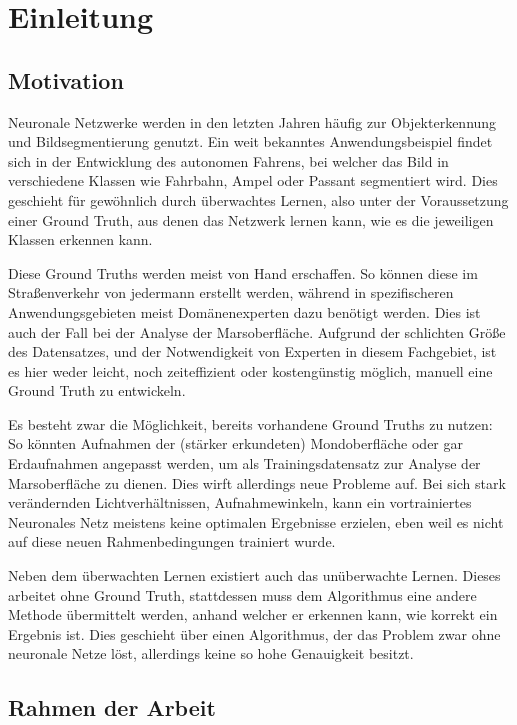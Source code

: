 \chapter{Einleitung}
\label{chap:einleitung}

\section{Motivation}
\label{sec:motivation}

Neuronale Netzwerke werden in den letzten Jahren häufig zur Objekterkennung und Bildsegmentierung genutzt. Ein weit bekanntes Anwendungsbeispiel findet sich in der Entwicklung des autonomen Fahrens, bei welcher das Bild in verschiedene Klassen wie \zB Fahrbahn, Ampel oder Passant segmentiert wird. Dies geschieht für gewöhnlich durch überwachtes Lernen, also unter der Voraussetzung einer Ground Truth, aus denen das Netzwerk lernen kann, wie es die jeweiligen Klassen erkennen kann.

Diese Ground Truths werden meist von Hand erschaffen. So können diese im Straßenverkehr von jedermann erstellt werden, während in spezifischeren Anwendungsgebieten meist Domänenexperten dazu benötigt werden. Dies ist auch der Fall bei der Analyse der Marsoberfläche. Aufgrund der schlichten Größe des Datensatzes, und der Notwendigkeit von Experten in diesem Fachgebiet, ist es hier weder leicht, noch zeiteffizient oder kostengünstig möglich, manuell eine Ground Truth zu entwickeln.

Es besteht zwar die Möglichkeit, bereits vorhandene Ground Truths zu nutzen: So könnten \bspw Aufnahmen der (stärker erkundeten) Mondoberfläche oder gar Erdaufnahmen angepasst werden, um als Trainingsdatensatz zur Analyse der Marsoberfläche zu dienen. Dies wirft allerdings neue Probleme auf. Bei \bspw sich stark verändernden Lichtverhältnissen, Aufnahmewinkeln, \oa kann ein vortrainiertes Neuronales Netz meistens keine optimalen Ergebnisse erzielen, eben weil es nicht auf diese neuen Rahmenbedingungen trainiert wurde.

Neben dem überwachten Lernen existiert auch das unüberwachte Lernen. Dieses arbeitet ohne Ground Truth, stattdessen muss dem Algorithmus eine andere Methode übermittelt werden, anhand welcher er erkennen kann, wie korrekt ein Ergebnis ist. Dies geschieht \zB über einen Algorithmus, der das Problem zwar ohne neuronale Netze löst, allerdings keine so hohe Genauigkeit besitzt.

\section{Rahmen der Arbeit}
\label{sec:rahmen}

